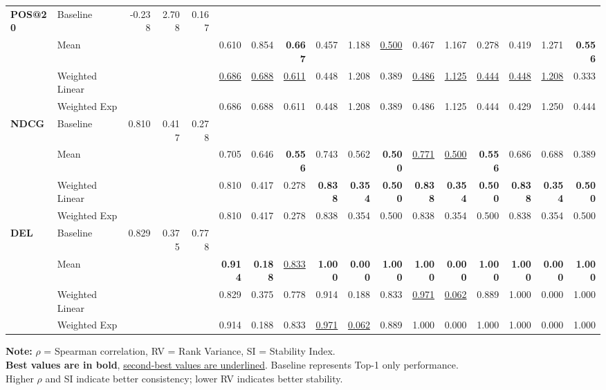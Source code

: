 \documentclass{article}
\begin{document}
\begin{table}[htbp]
\begin{tabular}{@{}llrrr|rrr|rrr|rrr|rrr@{}}
\multirow{4}{*}{\textbf{POS@20}} 
& Baseline & -0.238 & 2.708 & 0.167 & & & & & & & & & & & & \\
& Mean & & & & 0.610 & 0.854 & \textbf{0.667} & 0.457 & 1.188 & \uline{0.500} & 0.467 & 1.167 & 0.278 & 0.419 & 1.271 & \textbf{0.556} \\
& Weighted Linear & & & & \uline{0.686} & \uline{0.688} & \uline{0.611} & 0.448 & 1.208 & 0.389 & \uline{0.486} & \uline{1.125} & \uline{0.444} & \uline{0.448} & \uline{1.208} & 0.333 \\
& Weighted Exp & & & & 0.686 & 0.688 & 0.611 & 0.448 & 1.208 & 0.389 & 0.486 & 1.125 & 0.444 & 0.429 & 1.250 & 0.444 \\
\midrule

\multirow{4}{*}{\textbf{NDCG}} 
& Baseline & 0.810 & 0.417 & 0.278 & & & & & & & & & & & & \\
& Mean & & & & 0.705 & 0.646 & \textbf{0.556} & 0.743 & 0.562 & \textbf{0.500} & \uline{0.771} & \uline{0.500} & \textbf{0.556} & 0.686 & 0.688 & 0.389 \\
& Weighted Linear & & & & 0.810 & 0.417 & 0.278 & \textbf{0.838} & \textbf{0.354} & \textbf{0.500} & \textbf{0.838} & \textbf{0.354} & \textbf{0.500} & \textbf{0.838} & \textbf{0.354} & \textbf{0.500} \\
& Weighted Exp & & & & 0.810 & 0.417 & 0.278 & 0.838 & 0.354 & 0.500 & 0.838 & 0.354 & 0.500 & 0.838 & 0.354 & 0.500 \\
\midrule

\multirow{4}{*}{\textbf{DEL}} 
& Baseline & 0.829 & 0.375 & 0.778 & & & & & & & & & & & & \\
& Mean & & & & \textbf{0.914} & \textbf{0.188} & \uline{0.833} & \textbf{1.000} & \textbf{0.000} & \textbf{1.000} & \textbf{1.000} & \textbf{0.000} & \textbf{1.000} & \textbf{1.000} & \textbf{0.000} & \textbf{1.000} \\
& Weighted Linear & & & & 0.829 & 0.375 & 0.778 & 0.914 & 0.188 & 0.833 & \uline{0.971} & \uline{0.062} & 0.889 & 1.000 & 0.000 & 1.000 \\
& Weighted Exp & & & & 0.914 & 0.188 & 0.833 & \uline{0.971} & \uline{0.062} & 0.889 & 1.000 & 0.000 & 1.000 & 1.000 & 0.000 & 1.000 \\

\bottomrule
\end{tabular}
\begin{flushleft}
\textbf{Note:} $\rho$ = Spearman correlation, RV = Rank Variance, SI = Stability Index. \\
\textbf{Best values are in bold}, \uline{second-best values are underlined}. Baseline represents Top-1 only performance. \\
Higher $\rho$ and SI indicate better consistency; lower RV indicates better stability.
\end{flushleft}
\end{table}
\end{document}
